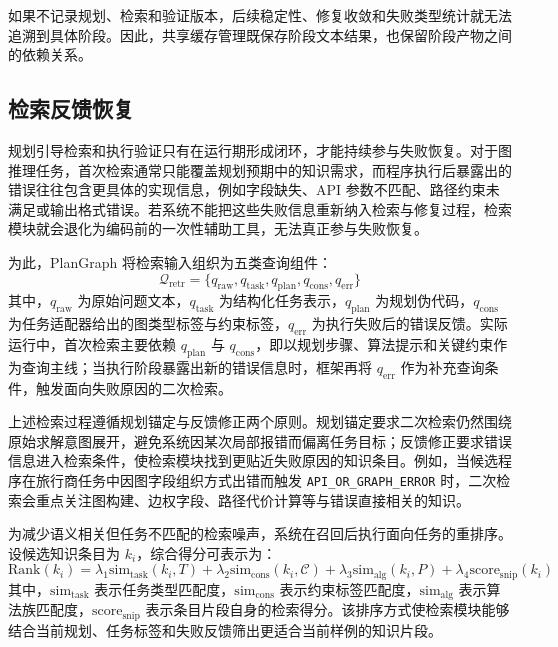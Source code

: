 如果不记录规划、检索和验证版本，后续稳定性、修复收敛和失败类型统计就无法追溯到具体阶段。因此，共享缓存管理既保存阶段文本结果，也保留阶段产物之间的依赖关系。

\subsection{检索反馈恢复}

规划引导检索和执行验证只有在运行期形成闭环，才能持续参与失败恢复。对于图推理任务，首次检索通常只能覆盖规划预期中的知识需求，而程序执行后暴露出的错误往往包含更具体的实现信息，例如字段缺失、API 参数不匹配、路径约束未满足或输出格式错误。若系统不能把这些失败信息重新纳入检索与修复过程，检索模块就会退化为编码前的一次性辅助工具，无法真正参与失败恢复。

为此，PlanGraph 将检索输入组织为五类查询组件：
\begin{equation}
\mathcal{Q}_{\mathrm{retr}}=\{q_{\mathrm{raw}},q_{\mathrm{task}},q_{\mathrm{plan}},q_{\mathrm{cons}},q_{\mathrm{err}}\}
\end{equation}
其中，$q_{\mathrm{raw}}$ 为原始问题文本，$q_{\mathrm{task}}$ 为结构化任务表示，$q_{\mathrm{plan}}$ 为规划伪代码，$q_{\mathrm{cons}}$ 为任务适配器给出的图类型标签与约束标签，$q_{\mathrm{err}}$ 为执行失败后的错误反馈。实际运行中，首次检索主要依赖 $q_{\mathrm{plan}}$ 与 $q_{\mathrm{cons}}$，即以规划步骤、算法提示和关键约束作为查询主线；当执行阶段暴露出新的错误信息时，框架再将 $q_{\mathrm{err}}$ 作为补充查询条件，触发面向失败原因的二次检索。

上述检索过程遵循规划锚定与反馈修正两个原则。规划锚定要求二次检索仍然围绕原始求解意图展开，避免系统因某次局部报错而偏离任务目标；反馈修正要求错误信息进入检索条件，使检索模块找到更贴近失败原因的知识条目。例如，当候选程序在旅行商任务中因图字段组织方式出错而触发 \texttt{API\_OR\_GRAPH\_ERROR} 时，二次检索会重点关注图构建、边权字段、路径代价计算等与错误直接相关的知识。

为减少语义相关但任务不匹配的检索噪声，系统在召回后执行面向任务的重排序。设候选知识条目为 $k_i$，综合得分可表示为：
\begin{equation}
\mathrm{Rank}(k_i)=
\lambda_1\mathrm{sim}_{\mathrm{task}}(k_i,T)
+\lambda_2\mathrm{sim}_{\mathrm{cons}}(k_i,\mathcal{C})
+\lambda_3\mathrm{sim}_{\mathrm{alg}}(k_i,P)
+\lambda_4\mathrm{score}_{\mathrm{snip}}(k_i)
\end{equation}
其中，$\mathrm{sim}_{\mathrm{task}}$ 表示任务类型匹配度，$\mathrm{sim}_{\mathrm{cons}}$ 表示约束标签匹配度，$\mathrm{sim}_{\mathrm{alg}}$ 表示算法族匹配度，$\mathrm{score}_{\mathrm{snip}}$ 表示条目片段自身的检索得分。该排序方式使检索模块能够结合当前规划、任务标签和失败反馈筛出更适合当前样例的知识片段。

